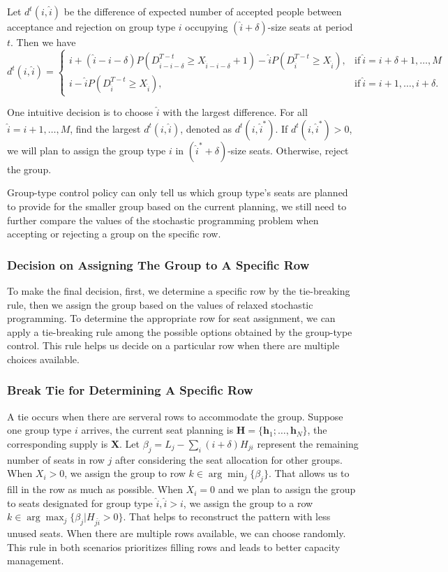 Let $d^{t}(i,\hat{i})$ be the difference of expected number of accepted people between acceptance and rejection on group type $i$ occupying $(\hat{i}+\delta)$-size seats at period $t$. Then we have
\begin{equation*}
	d^{t}(i,\hat{i}) = \begin{cases}
    i + (\hat{i}-i-\delta)P(D_{\hat{i}-i-\delta}^{T-t} \geq X_{\hat{i}-i-\delta}+1) - \hat{i} P(D_{\hat{i}}^{T-t} \geq X_{\hat{i}}), &\text{if}~ \hat{i} = i+\delta+1, \ldots, M \\
    i - \hat{i} P(D_{\hat{i}}^{T-t} \geq X_{\hat{i}}), &\text{if}~ \hat{i} = i+1, \ldots, i+\delta.
		\end{cases}
\end{equation*}


One intuitive decision is to choose $\hat{i}$ with the largest difference. For all $\hat{i} = i+1, \ldots, M$, find the largest $d^{t}(i,\hat{i})$, denoted as $d^{t}(i,\hat{i}^{*})$. If $d^{t}(i,\hat{i}^{*}) >0$, we will plan to assign the group type $i$ in $(\hat{i}^{*}+\delta)$-size seats. Otherwise, reject the group.

Group-type control policy can only tell us which group type's seats are planned to provide for the smaller group based on the current planning, we still need to further compare the values of the stochastic programming problem when accepting or rejecting a group on the specific row. 

\subsubsection{Decision on Assigning The Group to A Specific Row}
To make the final decision, first, we determine a specific row by the tie-breaking rule, then we assign the group based on the values of relaxed stochastic programming. To determine the appropriate row for seat assignment, we can apply a tie-breaking rule among the possible options obtained by the group-type control. This rule helps us decide on a particular row when there are multiple choices available. 

\subsubsection*{Break Tie for Determining A Specific Row}
A tie occurs when there are serveral rows to accommodate the group. Suppose one group type $i$ arrives, the current seat planning is $\bm{H} = \{\bm{h}_{1}; \ldots, \bm{h}_{N}\}$, the corresponding supply is $\bm{X}$. Let $\beta_{j} = L_j - \sum_{i} (i+\delta) H_{ji}$ represent the remaining number of seats in row $j$ after considering the seat allocation for other groups. When $X_{i} > 0$, we assign the group to row $k \in \arg \min_{j} \{\beta_{j}\}$. That allows us to fill in the row as much as possible. When $X_{i} = 0$ and we plan to assign the group to seats designated for group type $\hat{i}, \hat{i}>i$, we assign the group to a row $k \in \arg \max_{j} \{\beta_{j}| H_{j \hat{i}}>0\}$. That helps to reconstruct the pattern with less unused seats. When there are multiple rows available, we can choose randomly. This rule in both scenarios prioritizes filling rows and leads to better capacity management.

